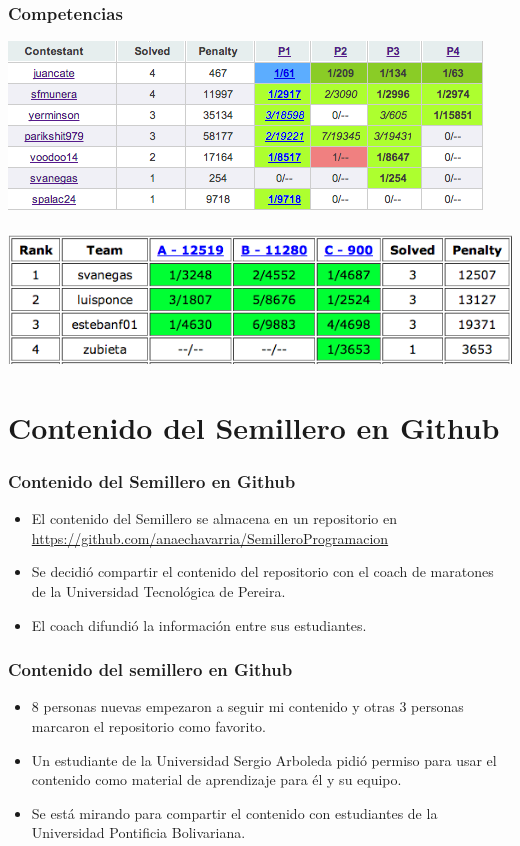\documentclass{beamer}
\begin{document}
	\begin{frame}
		\frametitle{Competencias}
		\includegraphics[width = \textwidth]{Contest1.png}\\ \quad \\
		\includegraphics[width = \textwidth]{Contest2.png}
	\end{frame}
	

\section[Contenido en Github]{Contenido del Semillero en Github}
	\begin{frame}
		\frametitle{Contenido del Semillero en Github}
		\begin{itemize}	
			\item El contenido del Semillero se almacena en un repositorio en \url{https://github.com/anaechavarria/SemilleroProgramacion}
			\item Se decidió compartir el contenido del repositorio con el coach de maratones de la Universidad Tecnológica de Pereira.
			\item El coach difundió la información entre sus estudiantes.
		\end{itemize}
	\end{frame}
	
	\begin{frame}
		\frametitle{Contenido del semillero en Github}
		\begin{itemize}
			\item 8 personas nuevas empezaron a seguir mi contenido y otras 3 personas marcaron el repositorio como favorito.
			\item Un estudiante de la Universidad Sergio Arboleda pidió permiso para usar el contenido como material de aprendizaje para él y su equipo.
			\item Se está mirando para compartir el contenido con estudiantes de la Universidad Pontificia Bolivariana.
		\end{itemize}
	\end{frame}
	
\end{document}
